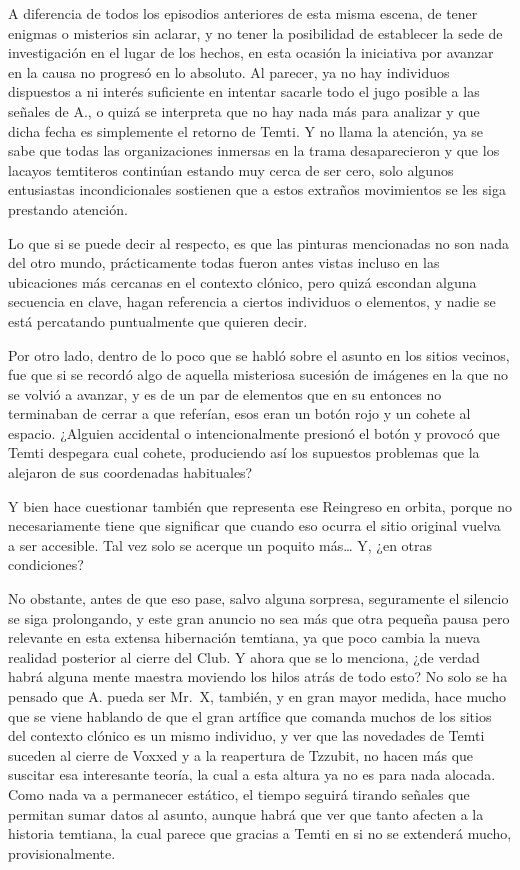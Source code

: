 \documentclass[
  spanish,
]{book}
\begin{document}
A diferencia de todos los episodios anteriores de esta misma escena, de tener enigmas o misterios sin aclarar, y no tener la posibilidad de establecer la sede de investigación en el lugar de los hechos, en esta ocasión la iniciativa por avanzar en la causa no progresó en lo absoluto. Al parecer, ya no hay individuos dispuestos a ni interés suficiente en intentar sacarle todo el jugo posible a las señales de A., o quizá se interpreta que no hay nada más para analizar y que dicha fecha es simplemente el retorno de Temti. Y no llama la atención, ya se sabe que todas las organizaciones inmersas en la trama desaparecieron y que los lacayos temtiteros continúan estando muy cerca de ser cero, solo algunos entusiastas incondicionales sostienen que a estos extraños movimientos se les siga prestando atención.

Lo que si se puede decir al respecto, es que las pinturas mencionadas no son nada del otro mundo, prácticamente todas fueron antes vistas incluso en las ubicaciones más cercanas en el contexto clónico, pero quizá escondan alguna secuencia en clave, hagan referencia a ciertos individuos o elementos, y nadie se está percatando puntualmente que quieren decir.

Por otro lado, dentro de lo poco que se habló sobre el asunto en los sitios vecinos, fue que si se recordó algo de aquella misteriosa sucesión de imágenes en la que no se volvió a avanzar, y es de un par de elementos que en su entonces no terminaban de cerrar a que referían, esos eran un botón rojo y un cohete al espacio. ¿Alguien accidental o intencionalmente presionó el botón y provocó que Temti despegara cual cohete, produciendo así los supuestos problemas que la alejaron de sus coordenadas habituales?

Y bien hace cuestionar también que representa ese Reingreso en orbita, porque no necesariamente tiene que significar que cuando eso ocurra el sitio original vuelva a ser accesible. Tal vez solo se acerque un poquito más\ldots{} Y, ¿en otras condiciones?

No obstante, antes de que eso pase, salvo alguna sorpresa, seguramente el silencio se siga prolongando, y este gran anuncio no sea más que otra pequeña pausa pero relevante en esta extensa hibernación temtiana, ya que poco cambia la nueva realidad posterior al cierre del Club.
Y ahora que se lo menciona, ¿de verdad habrá alguna mente maestra moviendo los hilos atrás de todo esto?
No solo se ha pensado que A. pueda ser Mr.~X, también, y en gran mayor medida, hace mucho que se viene hablando de que el gran artífice que comanda muchos de los sitios del contexto clónico es un mismo individuo, y ver que las novedades de Temti suceden al cierre de Voxxed y a la reapertura de Tzzubit, no hacen más que suscitar esa interesante teoría, la cual a esta altura ya no es para nada alocada. Como nada va a permanecer estático, el tiempo seguirá tirando señales que permitan sumar datos al asunto, aunque habrá que ver que tanto afecten a la historia temtiana, la cual parece que gracias a Temti en si no se extenderá mucho, provisionalmente.
\end{document}
